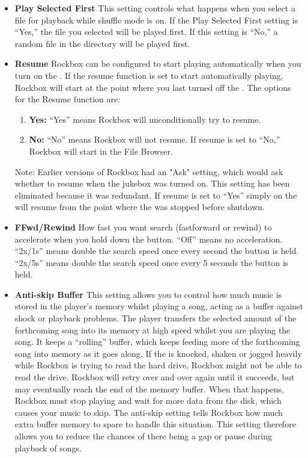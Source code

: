 \begin{itemize}
  \item \textbf{Play Selected First}
    This setting controls what happens when you select a file for playback while shuffle mode is on. If the Play Selected First setting is ``Yes,'' the file you selected will be played first. If this setting is ``No,'' a random file in the directory will be played first.
  \item \textbf{Resume}
    Rockbox can be configured to start playing automatically when you turn on the \dap.  If the resume function is set to start automatically playing, Rockbox will start at the point where you last turned off the \dap.  The options for the Resume function are:
    \begin{enumerate}
    \item\textbf{Yes:  }``Yes'' means Rockbox will unconditionally try to resume. 
    \item\textbf{No:  }``No'' means Rockbox will not resume. If resume is set to ``No,'' Rockbox will start in the File Browser.
    \end{enumerate}
    Note:  Earlier versions of Rockbox had an "Ask" setting, which would ask whether to resume when the jukebox was turned on. This setting has been eliminated because it was redundant. If resume is set to ``Yes'' simply on the \dap will resume from the point where the \dap was stopped before shutdown.
 
  \item \textbf{FFwd/Rewind}
    How fast you want search (fastforward or rewind) to accelerate when you hold down the button. ``Off'' means no acceleration. ``2x/1s'' means double the search speed once every second the button is held. ``2x/5s'' means double the search speed once every 5 seconds the button is held.

  \item \textbf{Anti-skip Buffer}
  This setting allows you to control how much music is stored in the player's memory whilst playing a song, acting as a buffer against shock or playback problems.  The player transfers the selected amount of the forthcoming song into its memory at high speed whilst you are playing the song. It keeps a ``rolling'' buffer, which keeps feeding more of the forthcoming song into memory as it goes along. If the \dap is knocked, shaken or jogged heavily while Rockbox is trying to read the hard drive, Rockbox might not be able to read the drive.  Rockbox will retry over and over again until it succeeds, but may eventually reach the end of the memory buffer.  When that happens, Rockbox must stop playing and wait for more data from the disk, which causes your music to skip.  The anti-skip setting tells Rockbox how much extra buffer memory to spare to handle this situation.  This setting therefore allows you to reduce the chances of there being a gap or pause during playback of songs.
  

\end{itemize}
